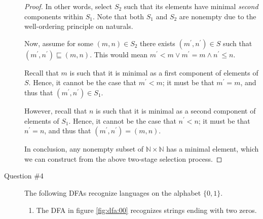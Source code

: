 \documentclass[letterpaper,11pt]{article}
\newcommand{\N}{\mathbb{N}}
\begin{document}
\begin{description}
\begin{proof}
        In other words, select $S_2$ such that its elements have minimal
        \emph{second} components within $S_1$. Note that both $S_1$ and $S_2$
        are nonempty due to the well-ordering principle on naturals.

        Now, assume for some
        $(m, n) \in S_2$
        there exists
        $(m^\prime, n^\prime) \in S$
        such that
        $(m^\prime, n^\prime) \sqsubseteq (m, n)$.
        This would mean
        $m^\prime < m \lor m^\prime = m \land n^\prime \leq n$.

        Recall that $m$ is such that it is minimal as a first component of
        elements of $S$.
        Hence, it cannot be the case that $m^\prime < m$;
        it must be that
        $m^\prime = m$,
        and thus that
        $(m^\prime, n^\prime) \in S_1$.

        However, recall that $n$ is such that it is minimal as a second
        component of elements of $S_1$.
        Hence, it cannot be the case that $n^\prime < n$;
        it must be that
        $n^\prime = n$,
        and thus that
        $(m^\prime, n^\prime) = (m, n)$.

        In conclusion, any nonempty subset of $\N \times \N$ has a minimal
        element, which we can construct from the above two-stage selection
        process.
    \end{proof}

\item[Question \#4]
    The following DFAs recognize languages on the alphabet $\{0,1\}$.

    \begin{enumerate}
        \item The DFA in figure \ref{fig:dfa:00} recognizes strings ending with
            two zeros.

            \begin{figure}[H]
                \centering

\end{figure}
\end{enumerate}
\end{description}
\end{document}
